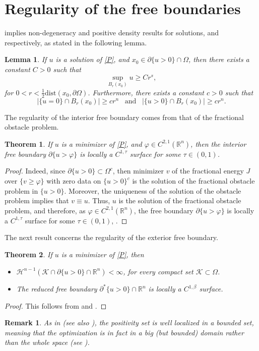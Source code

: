 \documentclass[11pt, reqno]{amsart}
\newtheorem{theorem}{Theorem}
\newtheorem{lemma}{Lemma}
\newtheorem{remark}{Remark}
\numberwithin{equation}{section}
\numberwithin{theorem}{section}
\numberwithin{lemma}{section}
\numberwithin{corollary}{section}
\numberwithin{remark}{section}
\numberwithin{proposition}{section}
\numberwithin{definition}{section}
\newcommand{\R}{\mathbb{R}}
\begin{document}
\section{Regularity of the free boundaries}
 implies non-degeneracy and positive density results for solutions, \cite[Lemma 2.2]{TT15} and \cite[Theorem 2.3]{TT15} respectively, as stated in the following lemma.
\begin{lemma}\label{t5.3}
	If $u$ is a solution of \eqref{P}, and $x_0\in\partial\{u>0\}\cap\Omega$, then there exists a constant $C>0$ such that 
	$$
	\sup_{B_r(x_0)}u\ge Cr^s,
	$$
	for $0<r<\frac{1}{2}\text{dist}(x_0,\partial\Omega)$. Furthermore, there exists a constant $c>0$ such that 
	$$
	|\{u=0\}\cap B_r(x_0)|\ge cr^n\,\,\,\textrm{ and }\,\,\,|\{u>0\}\cap B_r(x_0)|\ge cr^n.
	$$
\end{lemma}
The regularity of the interior free boundary comes from that of the fractional obstacle problem. 
    \begin{theorem}\label{t6.2}
        If $u$ is a minimizer of \eqref{P}, and $\varphi\in C^{2,1}(\R^n)$, then the interior free boundary $\partial\{u>\varphi\}$ is locally a $C^{1,\tau}$ surface for some $\tau\in(0,1)$.
    \end{theorem}
    \begin{proof}
        Indeed, since $\partial\{u>0\}\subset\Omega^c$, then minimizer $v$ of the fractional energy $J$ over $\{v\ge\varphi\}$ with zero data on $\{u>0\}^c$ is the solution of the fractional obstacle problem in $\{u>0\}$. Moreover, the uniqueness of the solution of the obstacle problem implies that $v\equiv u$. Thus, $u$ is the solution of the fractional obstacle problem, and therefore, as $\varphi\in C^{2,1}(\R^n)$, the free boundary $\partial\{u>\varphi\}$ is locally a $C^{1,\tau}$ surface for some $\tau\in(0,1)$, \cite[Theorem 7.7]{CSS08}.
    \end{proof}
The next result concerns the regularity of the exterior free boundary.
\begin{theorem}\label{t5.5}
	If $u$ is a minimizer of \eqref{P}, then
	\begin{itemize}
		\item $\mathcal{H}^{n-1}(\mathcal{K}\cap\partial\{u>0\}\cap\mathbb{R}^n)<\infty$, for every compact set $\mathcal{K}\subset\Omega$.
		\item The reduced free boundary $\partial^*\{u>0\}\cap\mathbb{R}^n$ is locally a $C^{1,\beta}$ surface.
	\end{itemize}
\end{theorem}
\begin{proof}
	This follows from  and .
\end{proof}
\begin{remark}\label{r5.1}
	As in \cite[Theorem 6.4]{Y16} (see also \cite[Lemma 6.2]{TU17}), the positivity set is well localized in a bounded set, meaning that the optimization is in fact in a big (but bounded) domain rather than the whole space (see ).
\end{remark}
\end{document}
